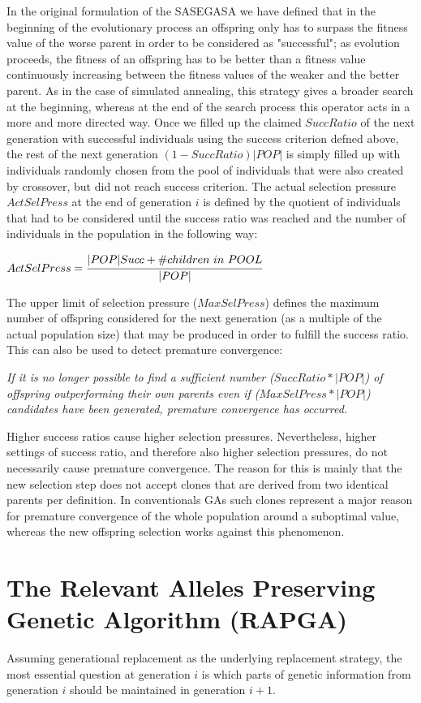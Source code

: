 \documentclass[12pt]{book}
\begin{document}
In the original formulation of the SASEGASA we have defined that in the beginning of the evolutionary process an offspring only has to surpass the fitness value of the worse parent in order to be considered as "successful"; as evolution proceeds, the fitness of an offspring has to be better than a fitness value continuously increasing between the fitness values of the weaker and the better parent. As in the case of simulated annealing, this strategy gives a broader search at the beginning, whereas at the end of the search process this operator acts in a more and more directed way. Once we filled up the claimed $SuccRatio$ of the next generation with successful individuals using the success criterion defned above, the rest of the next generation $(1-SuccRatio)|POP|$ is simply filled up with individuals randomly chosen from the pool of individuals that were also created by crossover, but did not reach success criterion. The actual selection pressure $ActSelPress$ at the end of generation $i$ is defined by the quotient of individuals that had to be considered until the success ratio was reached and the number of individuals in the population in the following way:
\begin{center}
$ActSelPress = \cfrac{|POP|Succ+\#children\ in\ POOL}{|POP|}$
\end{center}
The upper limit of selection pressure ($MaxSelPress$) defines the maximum number of offspring considered for the next generation (as a multiple of the actual population size) that may be produced in order to fulfill the success ratio. This can also be used to detect premature convergence:


\textit{If it is no longer possible to find a sufficient number ($SuccRatio*|POP|$) of offspring outperforming their own parents even if ($MaxSelPress*|POP|$) candidates have been generated, premature convergence has occurred.}

Higher success ratios cause higher selection pressures. Nevertheless, higher settings of success ratio, and therefore also higher selection pressures, do not necessarily cause premature convergence. The reason for this is mainly that the new selection step does not accept clones that are derived from two identical parents per definition. In conventionals GAs such clones represent a major reason for premature convergence of the whole population around a suboptimal value, whereas the new offspring selection works against this phenomenon.

\section{The Relevant Alleles Preserving Genetic Algorithm (RAPGA)}
Assuming generational replacement as the underlying replacement strategy, the most essential question at generation $i$ is which parts of genetic information from generation $i$ should be maintained in generation $i+1$.
\end{document}
